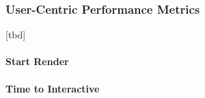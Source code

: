 




\subsubsection{User-Centric Performance Metrics}


[tbd]













\paragraph{Start Render}










\paragraph{Time to Interactive}




